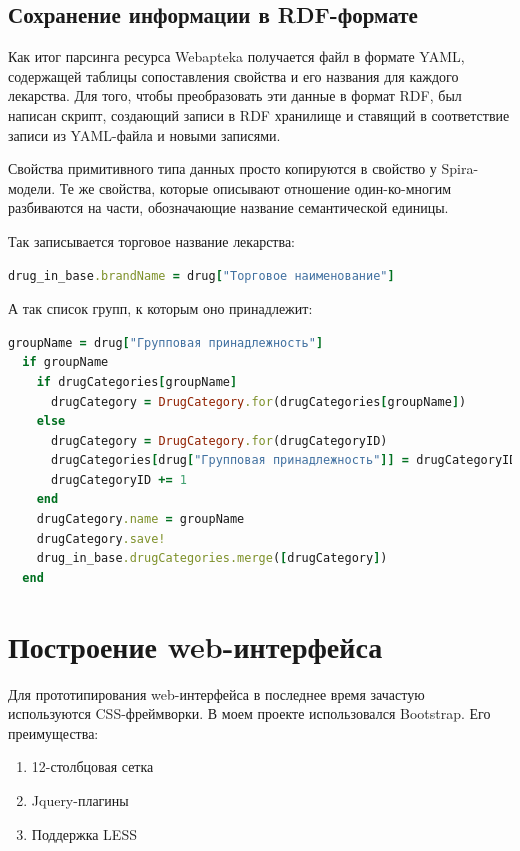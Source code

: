 \documentclass[specialist,subf,href,colorlinks=true
]{disser}
\begin{document}
\section{Сохранение информации в RDF-формате}
Как итог парсинга ресурса Webapteka получается файл в формате YAML, содержащей таблицы сопоставления свойства и его названия для каждого лекарства. Для того, чтобы преобразовать эти данные в формат RDF, был написан скрипт, создающий записи в RDF хранилище и ставящий в соответствие записи из YAML-файла и новыми записями.

Свойства примитивного типа данных просто копируются в свойство у Spira-модели. Те же свойства, которые описывают отношение один-ко-многим разбиваются на части, обозначающие название семантической единицы.

Так записывается торговое название лекарства:
\begin{lstlisting}[language=Ruby]
 drug_in_base.brandName = drug["Торговое наименование"]
\end{lstlisting}
А так список групп, к которым оно принадлежит:
\begin{lstlisting}[language=Ruby]
  groupName = drug["Групповая принадлежность"]
  if groupName
    if drugCategories[groupName]
      drugCategory = DrugCategory.for(drugCategories[groupName])
    else
      drugCategory = DrugCategory.for(drugCategoryID)
      drugCategories[drug["Групповая принадлежность"]] = drugCategoryID
      drugCategoryID += 1
    end
    drugCategory.name = groupName
    drugCategory.save!
    drug_in_base.drugCategories.merge([drugCategory])
  end
\end{lstlisting}


\chapter{Построение web-интерфейса}
Для прототипирования web-интерфейса в последнее время зачастую используются CSS-фреймворки. В моем проекте использовался Bootstrap. Его преимущества:
\begin{enumerate}
 \item 12-столбцовая сетка
 \item Jquery-плагины
 \item Поддержка LESS
\end{enumerate}
\end{document}
